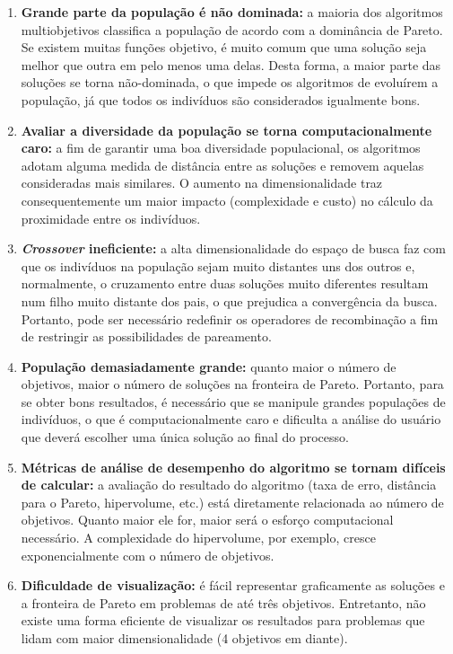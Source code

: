 \begin{enumerate}  
	\item \textbf{Grande parte da população é não dominada:} a maioria dos algoritmos multiobjetivos classifica a população de acordo com a dominância de Pareto. Se existem muitas funções objetivo, é muito comum que uma solução seja melhor que outra em pelo menos uma delas. Desta forma, a maior parte das soluções se torna não-dominada, o que impede os algoritmos de evoluírem a população, já que todos os indivíduos são considerados igualmente bons.
	\item \textbf{Avaliar a diversidade da população se torna computacionalmente caro:} a fim de garantir uma boa diversidade populacional, os algoritmos adotam alguma medida de distância entre as soluções e removem aquelas consideradas mais similares. O aumento na dimensionalidade traz consequentemente um maior impacto (complexidade e custo) no cálculo da proximidade entre os indivíduos. 
	\item \textbf{\textit{Crossover} ineficiente:} a alta dimensionalidade do espaço de busca faz com que os indivíduos na população sejam muito distantes uns dos outros e, normalmente, o cruzamento entre duas soluções muito diferentes resultam num filho muito distante dos pais, o que prejudica a convergência da busca. Portanto, pode ser necessário redefinir os operadores de recombinação a fim de restringir as possibilidades de pareamento.
	\item \textbf{População demasiadamente grande:} quanto maior o número de objetivos, maior o número de soluções na fronteira de Pareto. Portanto, para se obter bons resultados, é necessário que se manipule grandes populações de indivíduos, o que é computacionalmente caro e dificulta a análise do usuário que deverá escolher uma única solução ao final do processo.
	\item \textbf{Métricas de análise de desempenho do algoritmo se tornam difíceis de calcular:} a avaliação do resultado do algoritmo (taxa de erro, distância para o Pareto, hipervolume, etc.) está diretamente relacionada ao número de objetivos. Quanto maior ele for, maior será o esforço computacional necessário. A complexidade do hipervolume, por exemplo, cresce exponencialmente com o número de objetivos.
	\item \textbf{Dificuldade de visualização:} é fácil representar graficamente as soluções e a fronteira de Pareto em problemas de até três objetivos. Entretanto, não existe uma forma eficiente de visualizar os resultados para problemas que lidam com maior dimensionalidade (4 objetivos em diante).
\end{enumerate}

